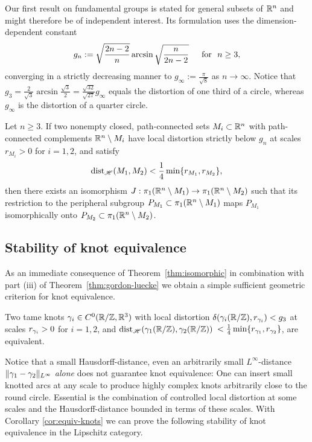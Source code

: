 Our first result on fundamental groups is stated for general 
subsets of $\mathbb{R}^n$ and might therefore
be of independent interest. Its formulation uses the
dimension-dependent constant
\begin{equation}\label{eq:dekster-jung}
g_n:=\sqrt{\frac{2n-2}n}\arcsin\sqrt{\frac{n}{2n-2}}
\quad\,\,\,\text{for }\,\, n\ge 3,
\end{equation}
converging in a strictly decreasing manner
to $g_\infty:=\frac{\pi}{\sqrt{8}}$ as $n\to\infty$. Notice 
that
$g_3= \frac2{\sqrt{3}}\arcsin\frac{\sqrt{3}}2
= \frac{\sqrt{32}}{\sqrt{27}}g_\infty$ equals the
distortion of one third of a circle, whereas $g_\infty$
is the distortion of a quarter circle.
\begin{theorem}\label{thm:isomorphic}
Let $n\ge 3$.
If two nonempty closed, path-connected sets $M_i\subset\mathbb{R}^n$ 
with path-connected complements
$\mathbb{R}^n\setminus M_i$ have local distortion strictly
below $g_n$
at scales $r_{M_i}>0$ for $i=1,2$, and satisfy
\begin{equation}\label{eq:hausdorff}
\operatorname{dist}_{\mathscr{H}}(M_1,M_2)<\frac14 \min\{r_{M_1},r_{M_2}\},
\end{equation}
then there exists an isomorphism $J:\pi_1(\mathbb{R}^n\setminus M_1)\to
\pi_1(\mathbb{R}^n\setminus M_2)$ such that its restriction to the peripheral
subgroup $P_{M_1}\subset \pi_1(\mathbb{R}^n\setminus M_1)$ maps $P_{M_1}$ isomorphically onto 
$P_{M_2}\subset \pi_1(\mathbb{R}^n\setminus M_2)$.
\end{theorem}


\subsection{Stability of knot equivalence}
As an immediate consequence of Theorem~\ref{thm:isomorphic} in combination with
part (iii) of Theorem~\ref{thm:gordon-luecke} we obtain a simple
sufficient geometric criterion for knot equivalence.
\begin{corollary}
\label{cor:equiv-knots}
Two tame knots $\gamma_i\in C^0(\mathbb{R}/\mathbb{Z},\mathbb{R}^3)$ with local 
distortion 
 $\delta(\gamma_i(\mathbb{R}/\mathbb{Z}),r_{\gamma_i})<g_3$
at scales $r_{\gamma_i}>0$
for $i=1,2$, and
$\operatorname{dist}_{\mathscr{H}}(\gamma_1(\mathbb{R}/\mathbb{Z}),\gamma_2(\mathbb{R}/\mathbb{Z}))$
$<\frac 14 \min\{r_{\gamma_1},r_{\gamma_2}\}$, are equivalent.
\end{corollary}

Notice that a small Hausdorff-distance, even an arbitrarily
small $L^\infty$-distance $\|\gamma_1-\gamma_2\|_{L^\infty}$
\emph{alone} does not guarantee knot equivalence:
One can insert small knotted arcs at any scale to produce highly complex
knots arbitrarily close to the round circle. Essential 
is the combination of controlled local
distortion at some scales and  
the Hausdorff-distance bounded in terms of these scales.
With Corollary \ref{cor:equiv-knots} we can prove 
the following stability of knot equivalence in the 
Lipschitz category.



